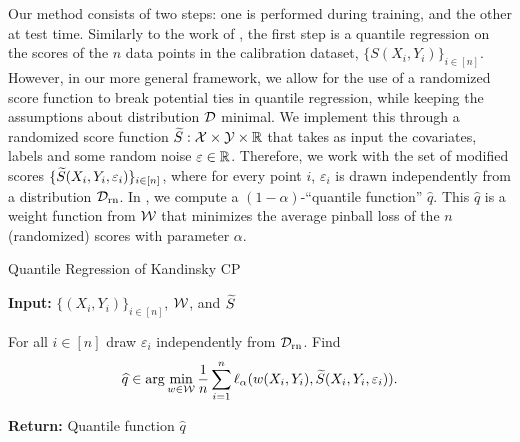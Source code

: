 Our method consists of two steps: one is performed during training, and the other at test time. Similarly to the work of \citet{JNRR2023}, the first step is a quantile regression on the scores of the $n$ data points in the calibration dataset, $\{S(X_i,Y_i)\}_{i\in [n]}$. However, in our more general framework, we allow for the use of a randomized score function to break potential ties in quantile regression, while keeping the assumptions about distribution ${\cal D}$ minimal. We implement this through a randomized score function ${\widetilde{S}}:{\cal X}\times{\cal Y}\times \mathbb{R}$ that takes as input the covariates, labels and some random noise $\varepsilon \in \mathbb{R}$. Therefore, we work with the set of modified scores $\{{\widetilde{S}}(X_i,Y_i, \varepsilon_i)\}_{i\in [n]}$, where for every point $i$, $\varepsilon_i$ is drawn independently from a distribution ${\cal D}_{\text{rn}}$. In , we compute a $(1-\alpha)$-``quantile function'' $\hat q$. This $\hat q$ is a weight function from ${\cal W}$ that minimizes the average pinball loss of the $n$ (randomized) scores with parameter $\alpha$.
\begin{comment}
That is,
\begin{align}
    \hat{q} \in \arg \min_{w \in \cal W} &\frac{1}{n} \sum_{i=1}^n \ell_\alpha (w(X_i,Y_i), \tS(S(X_i,Y_i), \varepsilon_i)). 
    \label{eq:quantile_reg}
\end{align}
\end{comment}
\begin{algorithm}
\caption{Quantile Regression of Kandinsky CP}
\label{alg:quantile_reg}
\textbf{Input:} $\{(X_i,Y_i)\}_{i \in [n]}$, ${\cal W}$, and ${\widetilde{S}}$
\begin{algorithmic}[1]
    
    \STATE For all $i \in [n]$ draw $\varepsilon_i$ independently from ${\cal D}_{\text{rn}}$.
    \STATE Find
    $$\widehat{q} \in \arg \min_{w \in \cal W} \frac{1}{n} \sum_{i=1}^n \ell_\alpha (w(X_i,Y_i), {\widetilde{S}}(X_i,Y_i, \varepsilon_i)).$$
\end{algorithmic}
 \textbf{Return:} Quantile function $\hat q$
\end{algorithm}

